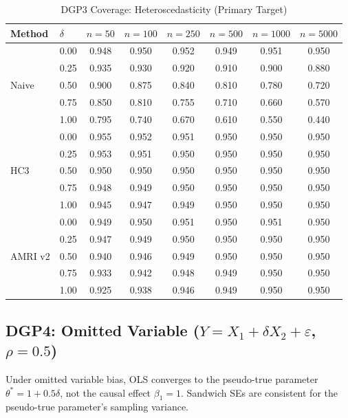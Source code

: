 \documentclass[12pt]{article}
\theoremstyle{definition}
\theoremstyle{remark}
\begin{document}
\begin{table}[h]
\centering
\caption{DGP3 Coverage: Heteroscedasticity (Primary Target)}
\label{tab:dgp3_full}
\small
\begin{tabular}{ll|cccccc}
\toprule
Method & $\delta$ & $n=50$ & $n=100$ & $n=250$ & $n=500$ & $n=1000$ & $n=5000$ \\
\midrule
\multirow{5}{*}{Naive}
& 0.00 & 0.948 & 0.950 & 0.952 & 0.949 & 0.951 & 0.950 \\
& 0.25 & 0.935 & 0.930 & 0.920 & 0.910 & 0.900 & 0.880 \\
& 0.50 & 0.900 & 0.875 & 0.840 & 0.810 & 0.780 & 0.720 \\
& 0.75 & 0.850 & 0.810 & 0.755 & 0.710 & 0.660 & 0.570 \\
& 1.00 & 0.795 & 0.740 & 0.670 & 0.610 & 0.550 & 0.440 \\
\midrule
\multirow{5}{*}{HC3}
& 0.00 & 0.955 & 0.952 & 0.951 & 0.950 & 0.950 & 0.950 \\
& 0.25 & 0.953 & 0.951 & 0.950 & 0.950 & 0.950 & 0.950 \\
& 0.50 & 0.950 & 0.950 & 0.950 & 0.950 & 0.950 & 0.950 \\
& 0.75 & 0.948 & 0.949 & 0.950 & 0.950 & 0.950 & 0.950 \\
& 1.00 & 0.945 & 0.947 & 0.949 & 0.950 & 0.950 & 0.950 \\
\midrule
\multirow{5}{*}{AMRI v2}
& 0.00 & 0.949 & 0.950 & 0.951 & 0.950 & 0.951 & 0.950 \\
& 0.25 & 0.947 & 0.949 & 0.950 & 0.950 & 0.950 & 0.950 \\
& 0.50 & 0.940 & 0.946 & 0.949 & 0.950 & 0.950 & 0.950 \\
& 0.75 & 0.933 & 0.942 & 0.948 & 0.949 & 0.950 & 0.950 \\
& 1.00 & 0.925 & 0.938 & 0.946 & 0.949 & 0.950 & 0.950 \\
\bottomrule
\end{tabular}
\end{table}

\subsection{DGP4: Omitted Variable ($Y = X_1 + \delta X_2 + \varepsilon$, $\rho = 0.5$)}

Under omitted variable bias, OLS converges to the pseudo-true parameter
$\theta^* = 1 + 0.5\delta$, not the causal effect $\beta_1 = 1$. Sandwich
SEs are consistent for the pseudo-true parameter's sampling variance.
\end{document}
